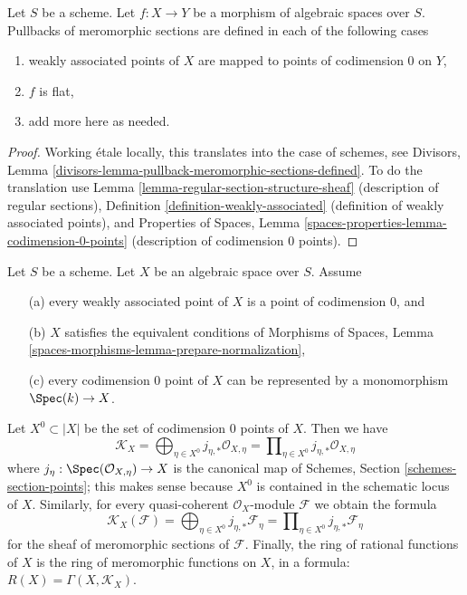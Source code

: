 \begin{lemma}
\label{lemma-pullback-meromorphic-sections-defined}
Let $S$ be a scheme. Let $f : X \to Y$ be a morphism of algebraic spaces
over $S$. Pullbacks of meromorphic sections are defined
in each of the following cases
\begin{enumerate}
\item weakly associated points of $X$ are mapped
to points of codimension $0$ on $Y$,
\item $f$ is flat,
\item add more here as needed.
\end{enumerate}
\end{lemma}

\begin{proof}
Working \'etale locally, this translates into the case of schemes, see
Divisors, Lemma \ref{divisors-lemma-pullback-meromorphic-sections-defined}.
To do the translation use Lemma \ref{lemma-regular-section-structure-sheaf}
(description of regular sections),
Definition \ref{definition-weakly-associated} (definition
of weakly associated points), and
Properties of Spaces, Lemma \ref{spaces-properties-lemma-codimension-0-points}
(description of codimension $0$ points).
\end{proof}

\begin{lemma}
\label{lemma-compute-meromorphic}
Let $S$ be a scheme. Let $X$ be an algebraic space over $S$. Assume
\begin{enumerate}
\item[(a)] every weakly associated point of $X$
is a point of codimension $0$, and
\item[(b)] $X$ satisfies the equivalent conditions
of Morphisms of Spaces, Lemma
\ref{spaces-morphisms-lemma-prepare-normalization},
\item[(c)] every codimension $0$ point of $X$ can be represented
by a monomorphism $\Spec(k) \to X$.
\end{enumerate}
Let $X^0 \subset |X|$ be the set of codimension $0$ points of $X$.
Then we have
$$
\mathcal{K}_X =
\bigoplus\nolimits_{\eta \in X^0} j_{\eta, *}\mathcal{O}_{X, \eta} =
\prod\nolimits_{\eta \in X^0} j_{\eta, *}\mathcal{O}_{X, \eta}
$$
where $j_\eta : \Spec(\mathcal{O}_{X, \eta}) \to X$ is the canonical map
of Schemes, Section \ref{schemes-section-points}; this makes sense because
$X^0$ is contained in the schematic locus of $X$. Similarly,
for every quasi-coherent $\mathcal{O}_X$-module $\mathcal{F}$
we obtain the formula
$$
\mathcal{K}_X(\mathcal{F}) =
\bigoplus\nolimits_{\eta \in X^0} j_{\eta, *}\mathcal{F}_\eta =
\prod\nolimits_{\eta \in X^0} j_{\eta, *}\mathcal{F}_\eta
$$
for the sheaf of meromorphic sections of $\mathcal{F}$.
Finally, the ring of rational functions of $X$ is the ring of meromorphic
functions on $X$, in a formula: $R(X) = \Gamma(X, \mathcal{K}_X)$.
\end{lemma}

